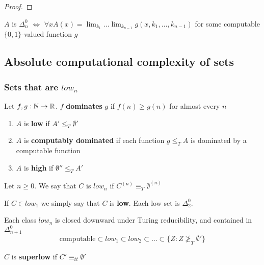 \documentclass[11pt]{article}
\begin{document}
\begin{proof}

\end{proof}

\begin{exercise}
\label{1.4.25}
\(A\) is \(\Delta_n^0\) \(\Leftrightarrow\) \(\forall x A(x)=\lim_{k_1}\dots\lim_{k_{n-1}}g(x,k_1,\dots,k_{n-1})\) for some
computable \(\{0,1\}\)-valued function \(g\)
\end{exercise}
\subsection{Absolute computational complexity of sets}
\label{sec:org6eb2f8c}
\subsubsection{Sets that are \texorpdfstring{\(low_n\)}{lown}}
\label{sec:orgdc0ef95}
\begin{definition}[]
Let \(f,g:\mathbb{N}\to\mathbb{R}\). \(f\) \textbf{dominates} \(g\) if \(f(n)\ge g(n)\) for almost every \(n\)
\end{definition}

\begin{enumerate}
\item \(A\) is \textbf{low} if \(A'\le_T\emptyset'\)
\item \(A\) is \textbf{computably dominated} if each function \(g\le_TA\) is dominated by a computable
function
\item \(A\) is \textbf{high} if \(\emptyset''\le_TA'\)
\end{enumerate}


\begin{definition}[]
Let \(n\ge 0\). We say that \(C\) is \(low_n\) if \(C^{(n)}\equiv_T\emptyset^{(n)}\)
\end{definition}

If \(C\in low_1\) we simply say that \(C\) is \textbf{low}. Each low set is \(\Delta_2^0\).

Each class \(low_n\) is closed downward under Turing reducibility, and contained in \(\Delta_{n+1}^0\)
\begin{equation*}
\text{computable}\subset low_1\subset low_2\subset\dots\subset\{Z:Z\not\ge_T\emptyset'\}
\end{equation*}

\begin{definition}[]
\(C\) is \textbf{superlow} if \(C'\equiv_{tt}\emptyset'\)
\end{definition}
\end{document}
